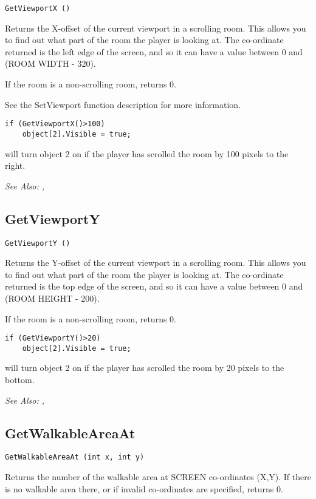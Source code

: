 \begin{verbatim}
GetViewportX ()
\end{verbatim}
Returns the X-offset of the current viewport in a scrolling room. This
allows you to find out what part of the room the player is looking at.
The co-ordinate returned is the left edge of the screen, and so it can
have a value between 0 and (ROOM WIDTH - 320).

If the room is a non-scrolling room, returns 0.

See the SetViewport function description for more information.

\begin{verbatim}
if (GetViewportX()>100)
    object[2].Visible = true;
\end{verbatim}
will turn object 2 on if the player has scrolled the room by 100 pixels to the right.

\it{See Also:} , 

\subsection{GetViewportY}\label{GetViewportY}%

\begin{verbatim}
GetViewportY ()
\end{verbatim}
Returns the Y-offset of the current viewport in a scrolling room. This
allows you to find out what part of the room the player is looking at.
The co-ordinate returned is the top edge of the screen, and so it can
have a value between 0 and (ROOM HEIGHT - 200).

If the room is a non-scrolling room, returns 0.

\begin{verbatim}
if (GetViewportY()>20)
    object[2].Visible = true;
\end{verbatim}
will turn object 2 on if the player has scrolled the room by 20 pixels to the bottom.

\it{See Also:} , 


\subsection{GetWalkableAreaAt}\label{GetWalkableAreaAt}%

\begin{verbatim}
GetWalkableAreaAt (int x, int y)
\end{verbatim}
Returns the number of the walkable area at SCREEN co-ordinates (X,Y).
If there is no walkable area there, or if invalid co-ordinates are specified,
returns 0.

